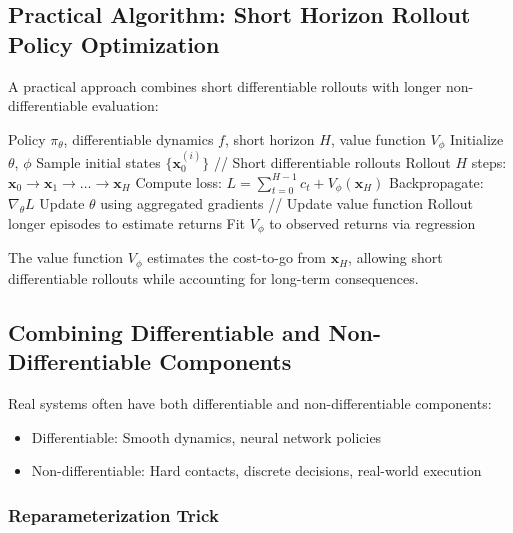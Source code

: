 \subsection{Practical Algorithm: Short Horizon Rollout Policy Optimization}

A practical approach combines short differentiable rollouts with longer non-differentiable evaluation:

\begin{algorithm}[H]
\caption{Short Horizon Rollout Policy Optimization (SHAC-style)}
\label{alg:short_horizon}
\begin{algorithmic}[1]
\REQUIRE Policy $\pi_\theta$, differentiable dynamics $f$, short horizon $H$, value function $V_\phi$
\STATE Initialize $\theta$, $\phi$
\REPEAT
    \STATE Sample initial states $\{\mathbf{x}_0^{(i)}\}$
    \STATE // Short differentiable rollouts
        \STATE Rollout $H$ steps: $\mathbf{x}_0 \to \mathbf{x}_1 \to \ldots \to \mathbf{x}_H$
        \STATE Compute loss: $L = \sum_{t=0}^{H-1} c_t + V_\phi(\mathbf{x}_H)$
        \STATE Backpropagate: $\nabla_\theta L$
    \ENDFOR
    \STATE Update $\theta$ using aggregated gradients
    \STATE // Update value function
    \STATE Rollout longer episodes to estimate returns
    \STATE Fit $V_\phi$ to observed returns via regression
\end{algorithmic}
\end{algorithm}

The value function $V_\phi$ estimates the cost-to-go from $\mathbf{x}_H$, allowing short differentiable rollouts while accounting for long-term consequences.

\subsection{Combining Differentiable and Non-Differentiable Components}

Real systems often have both differentiable and non-differentiable components:
\begin{itemize}
    \item Differentiable: Smooth dynamics, neural network policies
    \item Non-differentiable: Hard contacts, discrete decisions, real-world execution
\end{itemize}

\subsubsection{Reparameterization Trick}


